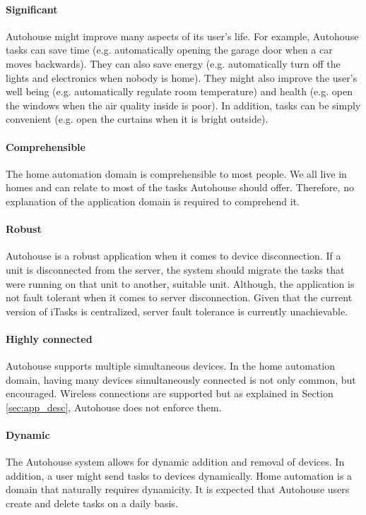 \paragraph{Significant} Autohouse might improve many aspects of its user's life. For example, Autohouse tasks can save time (e.g. automatically opening the garage door when a car moves backwards). They can also save energy (e.g. automatically turn off the lights and electronics when nobody is home). They might also improve the user's well being (e.g. automatically regulate room temperature) and health (e.g. open the windows when the air quality inside is poor). In addition, tasks can be simply convenient (e.g. open the curtains when it is bright outside).

\paragraph{Comprehensible} The home automation domain is comprehensible to most people. We all live in homes and can relate to most of the tasks Autohouse should offer. Therefore, no explanation of the application domain is required to comprehend it. 

\paragraph{Robust} Autohouse is a robust application when it comes to device disconnection. If a unit is disconnected from the server, the system should migrate the tasks that were running on that unit to another, suitable unit. Although, the application is not fault tolerant when it comes to server disconnection. Given that the current version of iTasks is centralized, server fault tolerance is currently unachievable.

\paragraph{Highly connected} Autohouse supports multiple simultaneous devices. In the home automation domain, having many devices simultaneously connected is not only common, but encouraged. Wireless connections are supported but as explained in Section \ref{sec:app_desc}, Autohouse does not enforce them. 

\paragraph{Dynamic} The Autohouse system allows for dynamic addition and removal of devices. In addition, a user might send tasks to devices dynamically. Home automation is a domain that naturally requires dynamicity. It is expected that Autohouse users create and delete tasks on a daily basis.

